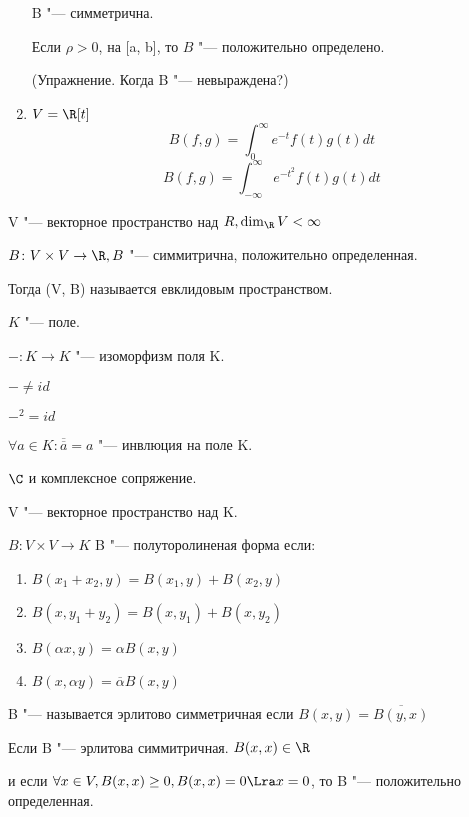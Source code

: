 \begin{exmp}
\begin{enumerate}
B "--- симметрична.

Если $\rho > 0$, на [a, b], то $B$ "--- положительно определено. 

(Упражнение. Когда B "--- невыраждена?)
\item $V = \R[t]$
$$B(f, g) = \int_{0}^{\infty}e^{-t}f(t)g(t)dt$$
$$B(f, g) = \int_{-\infty}^{\infty}e^{-t^2}f(t)g(t)dt$$
\end{enumerate}     
\end{exmp}

\begin{Def}
V "--- векторное пространство над $R, \dim_{\R}V < \infty$

$B \colon V \times V \to \R, B$ "--- симмитрична, положительно определенная.

Тогда (V, B) называется евклидовым пространством. 
\end{Def}

\begin{Def}
$K$ "--- поле.

$-\colon K \to K$ "--- изоморфизм поля K.

$- \ne id$

$-^2 = id$

$\forall a \in K\colon \overline{\overline{a}} = a$ "--- инвлюция на поле K.
\end{Def}

\begin{exmp}
$\C$ и комплексное сопряжение. 
\end{exmp}

\begin{Def}
V "--- векторное пространство над K. 

$B\colon V \times V \to K$  B "--- полуторолиненая форма если:

\begin{enumerate}
\item $B(x_1 + x_2, y) = B(x_1, y) + B(x_2, y)$
\item $B(x, y_1 + y_2) = B(x, y_1) + B(x, y_2)$
\item $B(\alpha x, y) = \alpha B(x, y)$
\item $B(x, \alpha y) = \overline{\alpha}B(x, y)$
\end{enumerate}
\end{Def}

\begin{Def}
B "--- называется эрлитово симметричная если 
$B(x, y) = \overline{B(y, x)}$
\end{Def}

\begin{Def}
Если B "--- эрлитова симмитричная.
$B(x, x) \in \R$

и если $\forall x \in V, B(x, x) \ge 0, B(x, x) = 0 \Lra x = 0$, то B "--- 
положительно определенная. 
\end{Def}



